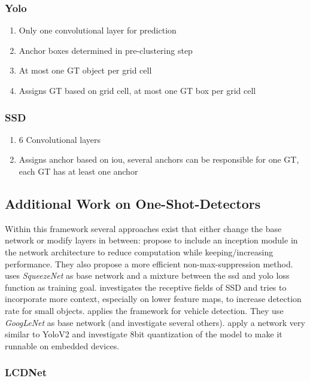 	\subsubsection{Yolo}
	\begin{enumerate}
		\item Only one convolutional layer for prediction
		\item Anchor boxes determined in pre-clustering step
		\item At most one GT object per grid cell
		\item Assigns GT based on grid cell, at most one GT box per grid cell
	\end{enumerate}
	\subsubsection{SSD}
	\begin{enumerate}
		\item 6 Convolutional layers
		\item Assigns anchor based on iou, several anchors can be responsible for one GT, each GT has at least one anchor
	\end{enumerate}
	
	\subsection{Additional Work on One-Shot-Detectors}
	
	Within this framework several approaches exist that either change the base network or modify layers in between: \cite{ChengchengNing2017} propose to include an inception module in the network architecture to reduce computation while keeping/increasing performance. They also propose a more efficient non-max-suppression method. \cite{Wu} uses \textit{SqueezeNet} as base network and a mixture between the ssd and yolo loss function as training goal. \cite{Xiang} investigates the receptive fields of SSD and tries to incorporate more context, especially on lower feature maps, to increase detection rate for small objects.\cite{Linb} applies the framework for vehicle detection. They use \textit{GoogLeNet} as base network (and investigate several others).\cite{TripathiSanDiego} apply a network very similar to YoloV2 and investigate 8bit quantization of the model to make it runnable on embedded devices.
	
	\subsubsection{LCDNet\cite{TripathiSanDiego}}
	
